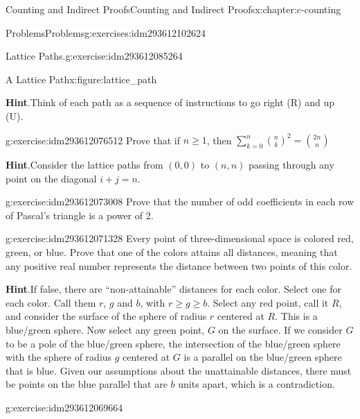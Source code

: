 \documentclass[twoside,10pt,]{book}
\newcommand{\blocktitlefont}{\relax}
\numberwithin{equation}{section}
\begin{document}
\begin{chapterptx}{Counting and Indirect Proofs}{}{Counting and Indirect Proofs}{}{}{x:chapter:c-counting}
\begin{exercises-section}{Problems}{}{Problems}{}{}{g:exercises:idm293612102624}
\begin{divisionexercise}{3}{Lattice Paths.}{}{g:exercise:idm293612085264}
\begin{figureptx}{A Lattice Path}{x:figure:lattice_path}{}
\begin{image}{0.2}{0.6}{0.2}
\end{image}%
\tcblower
\end{figureptx}%
\par\smallskip%
\noindent\textbf{\blocktitlefont Hint}.\label{g:hint:idm293612080000}{}\hypertarget{g:hint:idm293612080000}{}\quad{}Think of each path as a sequence of instructions to go right (R) and up (U).%
\end{divisionexercise}%
\begin{divisionexercise}{4}{}{}{g:exercise:idm293612076512}%
Prove that if \(n\geq 1\), then \(\sum _{k=0}^n \binom{n}{k}^2=\binom{2 n}{n}\)%
\par\smallskip%
\noindent\textbf{\blocktitlefont Hint}.\label{g:hint:idm293612074784}{}\hypertarget{g:hint:idm293612074784}{}\quad{}Consider the lattice paths from \((0,0)\) to \((n,n)\) passing through any point on the diagonal \(i + j = n\).%
\end{divisionexercise}%
\begin{divisionexercise}{5}{}{}{g:exercise:idm293612073008}%
Prove that the number of odd coefficients in each row of Pascal's triangle is a power of 2.%
\end{divisionexercise}%
\begin{divisionexercise}{6}{}{}{g:exercise:idm293612071328}%
Every point of three-dimensional space is colored red, green, or blue. Prove that one of the colors attains all distances, meaning that any positive real number represents the distance between two points of this color.%
\par\smallskip%
\noindent\textbf{\blocktitlefont Hint}.\label{g:hint:idm293612069920}{}\hypertarget{g:hint:idm293612069920}{}\quad{}If false, there are ``non-attainable'' distances for each color. Select one for each color.  Call them \(r\), \(g\) and \(b\), with  \(r \geq g \geq b\).  Select any red point, call it \(R\), and consider the surface of the sphere of radius \(r\) centered at \(R\).   This is a blue\slash{}green sphere.   Now select any green point, \(G\) on the surface. If we consider \(G\) to be a pole of the blue\slash{}green sphere, the intersection of the blue\slash{}green sphere with the sphere of radius \(g\)  centered at \(G\) is a parallel on the blue\slash{}green sphere that is blue.  Given our assumptions about the unattainable distances, there must be points on the blue parallel that are \(b\) units apart, which is a contradiction.%
\end{divisionexercise}%
\begin{divisionexercise}{7}{}{}{g:exercise:idm293612069664}%

\end{divisionexercise}
\end{exercises-section}
\end{chapterptx}
\end{document}
